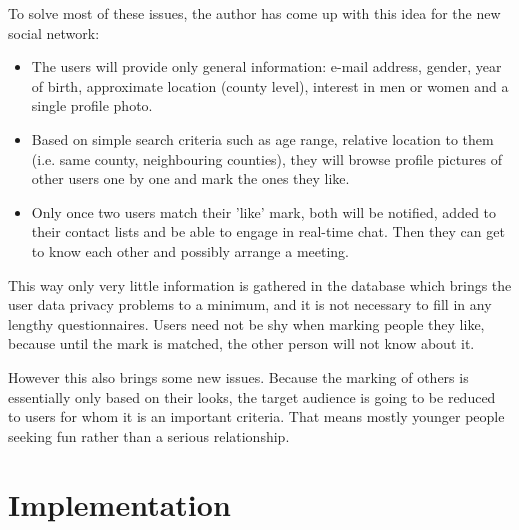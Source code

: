 \documentclass[12pt,oneside]{fithesis}
\begin{document}
	To solve most of these issues, the author has come up with this idea for the new social network:
	\begin{itemize}
		\item The users will provide only general information: e-mail address, gender, year of birth, approximate location (county level), interest in men or women and a single profile photo.
		\item Based on simple search criteria such as age range, relative location to them (i.e. same county, neighbouring counties), they will browse profile pictures of other users one by one and mark the ones they like.
		\item Only once two users match their 'like' mark, both will be notified, added to their contact lists and be able to engage in real-time chat. Then they can get to know each other and possibly arrange a meeting.
	\end{itemize}
	
	This way only very little information is gathered in the database which brings the user data privacy problems to a minimum, and it is not necessary to fill in any lengthy questionnaires. Users need not be shy when marking people they like, because until the mark is matched, the other person will not know about it.
	
	However this also brings some new issues. Because the marking of others is essentially only based on their looks, the target audience is going to be reduced to users for whom it is an important criteria. That means mostly younger people seeking fun rather than a serious relationship.
\chapter{Implementation}
\end{document}
